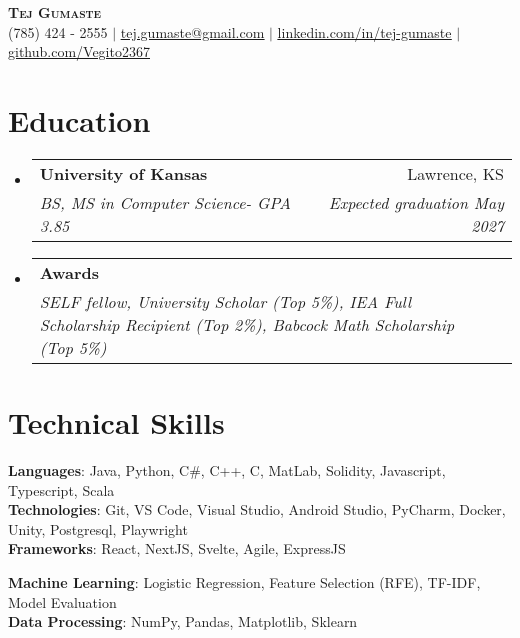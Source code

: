 \documentclass[letterpaper,10.5pt]{article}
\makeatletter
\newcommand{\resumeSubheading}[4]{
  \vspace{-2pt}\item
    \begin{tabular*}{0.97\textwidth}[t]{l@{\extracolsep{\fill}}r}
      \textbf{#1} & #2 \\
      \textit{\small#3} & \textit{\small #4} \\
    \end{tabular*}\vspace{-7pt}
}
\newcommand{\resumeSubHeadingListStart}{\begin{itemize}[leftmargin=0.15in, label={}]}
\newcommand{\resumeSubHeadingListEnd}{\end{itemize}}
\makeatother
\begin{document}

\begin{center}
    \textbf{\Huge \scshape Tej Gumaste} \\ \vspace{1pt}
    \small (785) 424 - 2555 $|$ \href{mailto:tej.gumaste@gmail.com}{\underline{tej.gumaste@gmail.com}} $|$ 
    \href{https://www.linkedin.com/in/tej-gumaste/}{\underline{linkedin.com/in/tej-gumaste}} $|$
    \href{https://www.github.com/Vegito2367}{\underline{github.com/Vegito2367}}
\end{center}


\section{Education}
  \resumeSubHeadingListStart
    \resumeSubheading
      {University of Kansas}{Lawrence, KS}
      {BS, MS in Computer Science- GPA 3.85} {Expected graduation May 2027}
      \resumeSubheading
      {Awards}{}
      {SELF fellow, University Scholar (Top 5\%), IEA Full Scholarship Recipient (Top 2\%), Babcock Math Scholarship (Top 5\%)}{}

  \resumeSubHeadingListEnd

\section{Technical Skills}
 \begin{itemize}[leftmargin=0.15in, label={}]
    \small{\item{
     \textbf{Languages}{: Java, Python, C\#, C++, C, MatLab, Solidity, Javascript, Typescript, Scala} \\
     \textbf{Technologies}{: Git, VS Code, Visual Studio, Android Studio, PyCharm, Docker, Unity, Postgresql, Playwright} \\
     \textbf{Frameworks}{: React, NextJS, Svelte, Agile, ExpressJS}\\
    }}
    \textbf{Machine Learning}{: Logistic Regression, Feature Selection (RFE), TF-IDF, Model Evaluation}\\
     \textbf{Data Processing}{: NumPy, Pandas, Matplotlib, Sklearn}
    
    
 \end{itemize}
  
\end{document}
